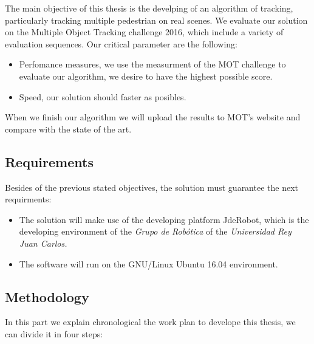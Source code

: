 \documentclass[12pt, a4paper, titlepage,twoside,openright]{article}
\begin{document}
The main objective of this thesis is the develping of an algorithm of tracking, particularly tracking multiple pedestrian on real scenes. We evaluate our solution on the Multiple Object Tracking challenge 2016, which include a variety of evaluation sequences. Our critical parameter are the following:

\begin{itemize}

\item Perfomance measures, we use the measurment of the MOT \cite{mot} challenge to evaluate our algorithm, we desire to have the highest possible score. 

\item Speed, our solution should faster as posibles.

\end{itemize}

When we finish our algorithm we will upload the results to MOT's website and compare with the state of the art.

\subsection{Requirements}

Besides of the previous stated objectives, the solution must guarantee the next requirments: 

\begin{itemize}

\item The solution will make use of the developing platform JdeRobot, which is the developing environment of the \textit{Grupo de Robótica} of the \textit{Universidad  Rey Juan Carlos.} 

\item The software will run on the GNU/Linux Ubuntu 16.04 environment.


\end{itemize}


\subsection{Methodology}

In this part we explain chronological the work plan to develope this thesis, we can divide it in four steps: 
\end{document}
